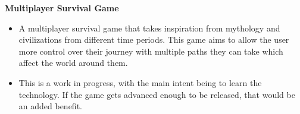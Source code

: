 \documentclass[a4paper]{article}
\begin{document}
            {\textbf{Multiplayer Survival Game}}\\
            \textit{}
            \vspace{-1mm}
            \begin{itemize} \itemsep 1pt
            
                    \item A multiplayer survival game that takes inspiration from mythology and civilizations from different time periods. This game aims to allow the user more control over their journey with multiple paths they can take which affect the world around them.
                
                    \item This is a work in progress, with the main intent being to learn the technology. If the game gets advanced enough to be released, that would be an added benefit.
                
            \end{itemize}
            \vspace*{2mm}
            
\end{document}
